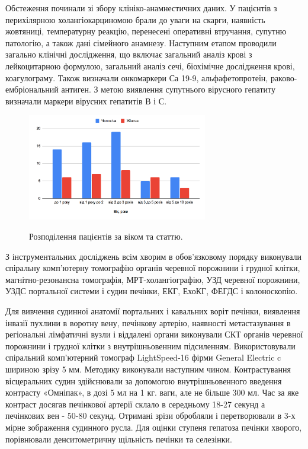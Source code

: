Обстеження починали зі збору клініко-анамнестичних даних. У пацієнтів з перихілярною холангіокарциномою брали до уваги на скарги, наявність жовтяниці, температурну реакцію, перенесені оперативні втручання, супутню патологію, а також дані сімейного анамнезу. Наступним етапом проводили загально клінічні дослідження, що включає загальний аналіз крові з лейкоцитарною формулою, загальний аналіз сечі, біохімічне дослідження крові, коагулограму. Також визначали онкомаркери Са 19-9, альфафетопротеїн, раково-ембріональний антиген. З метою виявлення супутнього вірусного гепатиту визначали маркери вірусних гепатитів В і С.

\begin{figure}[h]
\centering
\includegraphics[width=0.7\textwidth]{Illustrations/mw.png}
\label{fig:mw} %
\caption{Розподілення пацієнтів за віком та статтю.}
\end{figure}

З інструментальних досліджень всім хворим в обов'язковому порядку виконували спіральну комп'ютерну томографію органів черевної порожнини і грудної клітки, магнітно-резонансна томографія, МРТ-холангіографію, УЗД черевної порожнини, УЗДС портальної системи і судин печінки, ЕКГ, ЕхоКГ, ФЕГДС і колоноскопію. 

Для вивчення судинної анатомії портальних і кавальних воріт печінки, виявлення інвазії пухлини в воротну вену, печінкову артерію, наявності метастазування в регіональні лімфатичні вузли і віддалені органи виконували СКТ органів черевної порожнини і грудної клітки з внутрішньовенним підсиленням. Використовували спіральний комп'ютерний томограф LightSpeed-16 фірми General Electric c шириною зрізу 5 мм. Методику виконували наступним чином. Контрастування вісцеральних судин здійснювали за допомогою внутрішньовенного введення контрасту «Омніпак», в дозі 5 мл на 1 кг. ваги, але не більше 300 мл. Час за яке контраст досягав печінкової артерії склало в середньому 18-27 секунд а печінкових вен - 50-80 секунд. Отримані зрізи обробляли і перетворювали в 3-х мірне зображення судинного русла. Для оцінки ступеня гепатоза печінки хворого, порівнювали денситометричну щільність печінки та селезінки.

